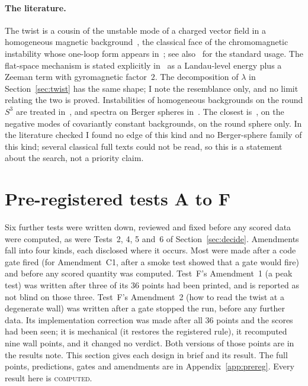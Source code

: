 \documentclass[11pt]{article}
\theoremstyle{definition}
\theoremstyle{remark}
\newcommand{\COMPUTED}{\textsc{computed}}
\begin{document}
\paragraph{The literature.} The twist is a cousin of the unstable mode of a charged vector field in a homogeneous
magnetic background~\cite{nielsenolesen1978}, the classical face of the chromomagnetic instability whose one-loop form
appears in~\cite{savvidy1977}; see also~\cite{tanjiitakura2012} for the standard usage. The flat-space mechanism is
stated explicitly in~\cite{bcgk2014} as a Landau-level energy plus a Zeeman term with gyromagnetic factor~$2$. The
decomposition of $\lambda$ in Section~\ref{sec:twist} has the same shape; I note the resemblance only, and no limit
relating the two is proved. Instabilities of homogeneous backgrounds on the round $S^3$ are treated
in~\cite{avramidicollopy2012,klc2021}, and spectra on Berger spheres in~\cite{lauret2019,henkellauret2026}. The closest
is~\cite{avramidicollopy2012}, on the negative modes of covariantly constant backgrounds, on the round sphere only. In
the literature checked I found no edge of this kind and no Berger-sphere family of this kind; several classical full
texts could not be read, so this is a statement about the search, not a priority claim.

\section{Pre-registered tests A to F}\label{sec:prereg}

Six further tests were written down, reviewed and fixed before any scored data were computed, as were Tests~2, 4, 5
and~6 of Section~\ref{sec:decide}. Amendments fall into four kinds, each disclosed where it occurs. Most were made
after a code gate fired (for Amendment~C1, after a smoke test showed that a gate would fire) and before any scored
quantity was computed. Test~F's Amendment~1 (a peak test) was written after three of its $36$ points had been
printed, and is reported as not blind on those three. Test~F's Amendment~2 (how to read the twist at a degenerate
wall) was written after a gate stopped the run, before any further data. Its implementation correction was made after
all $36$ points and the scores had been seen; it is mechanical (it restores the registered rule), it recomputed nine
wall points, and it changed no verdict. Both versions of those points are in the results note. This section gives each design in brief and
its result. The full points, predictions, gates and amendments are in Appendix~\ref{app:prereg}. Every result here is
\COMPUTED.
\end{document}
